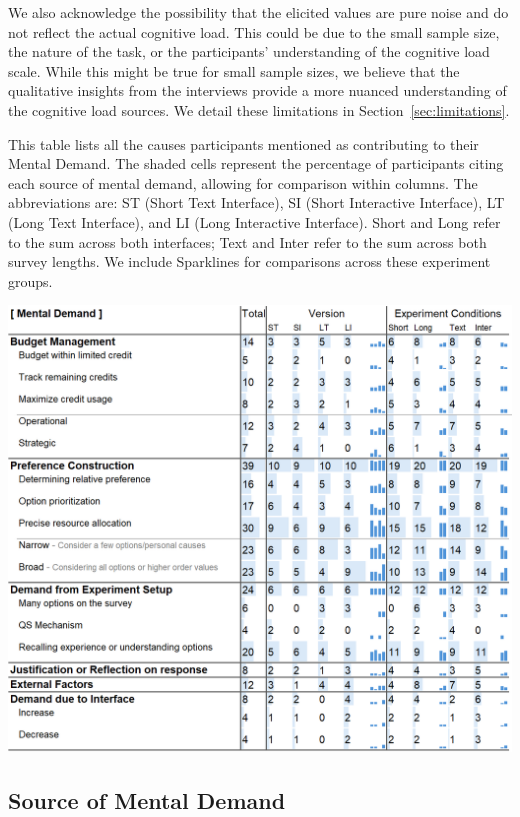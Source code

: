 We also acknowledge the possibility that the elicited values are pure noise and do not reflect the actual cognitive load. This could be due to the small sample size, the nature of the task, or the participants' understanding of the cognitive load scale. While this might be true for small sample sizes, we believe that the qualitative insights from the interviews provide a more nuanced understanding of the cognitive load sources. We detail these limitations in Section~\ref{sec:limitations}.

\begin{table}[h]
    \caption{This table lists all the causes participants mentioned as contributing to their Mental Demand. The shaded cells represent the percentage of participants citing each source of mental demand, allowing for comparison within columns. The abbreviations are: ST (Short Text Interface), SI (Short Interactive Interface), LT (Long Text Interface), and LI (Long Interactive Interface). Short and Long refer to the sum across both interfaces; Text and Inter refer to the sum across both survey lengths. We include Sparklines for comparisons across these experiment groups.}
    \label{tbl:mental}
    \includegraphics[width=\linewidth]{content/image/cog/mental_table.png}
\end{table}
\subsection{Source of Mental Demand}
\label{sec:mental}

